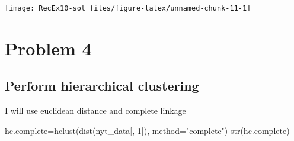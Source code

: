 \documentclass[
]{article}
\newenvironment{Shaded}{\begin{snugshade}}{\end{snugshade}}
\newcommand{\AttributeTok}[1]{\textcolor[rgb]{0.77,0.63,0.00}{#1}}
\newcommand{\DecValTok}[1]{\textcolor[rgb]{0.00,0.00,0.81}{#1}}
\newcommand{\FunctionTok}[1]{\textcolor[rgb]{0.00,0.00,0.00}{#1}}
\newcommand{\NormalTok}[1]{#1}
\newcommand{\OtherTok}[1]{\textcolor[rgb]{0.56,0.35,0.01}{#1}}
\newcommand{\SpecialCharTok}[1]{\textcolor[rgb]{0.00,0.00,0.00}{#1}}
\newcommand{\StringTok}[1]{\textcolor[rgb]{0.31,0.60,0.02}{#1}}
\begin{document}
\begin{Shaded}
\end{Shaded}

\begin{center}\texttt{[image: RecEx10-sol\_files/figure-latex/unnamed-chunk-11-1]} \end{center}

\hypertarget{problem-4}{%
\section{Problem 4}\label{problem-4}}

\hypertarget{perform-hierarchical-clustering}{%
\subsection{Perform hierarchical
clustering}\label{perform-hierarchical-clustering}}

I will use euclidean distance and complete linkage

\begin{Shaded}
\begin{Highlighting}[]
\NormalTok{hc.complete}\OtherTok{=}\FunctionTok{hclust}\NormalTok{(}\FunctionTok{dist}\NormalTok{(nyt\_data[,}\SpecialCharTok{{-}}\DecValTok{1}\NormalTok{]), }\AttributeTok{method=}\StringTok{"complete"}\NormalTok{)}
\FunctionTok{str}\NormalTok{(hc.complete)}
\end{Highlighting}
\end{Shaded}
\end{document}
